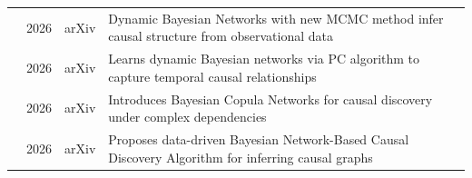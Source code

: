 \begin{table}[!t]
\begin{tabularx}{\textwidth}{@{}l c p{3.6cm} X@{}}
\cite{zhang2026dynamicb} & 2026 & arXiv & Dynamic Bayesian Networks with new MCMC method infer causal structure from observational data \\
\cite{zhang2026causali} & 2026 & arXiv & Learns dynamic Bayesian networks via PC algorithm to capture temporal causal relationships \\
\cite{zhang2026causalj} & 2026 & arXiv & Introduces Bayesian Copula Networks for causal discovery under complex dependencies \\
\cite{zhang2026bayesianb} & 2026 & arXiv & Proposes data-driven Bayesian Network-Based Causal Discovery Algorithm for inferring causal graphs \\
\bottomrule
\end{tabularx}
\end{table}


